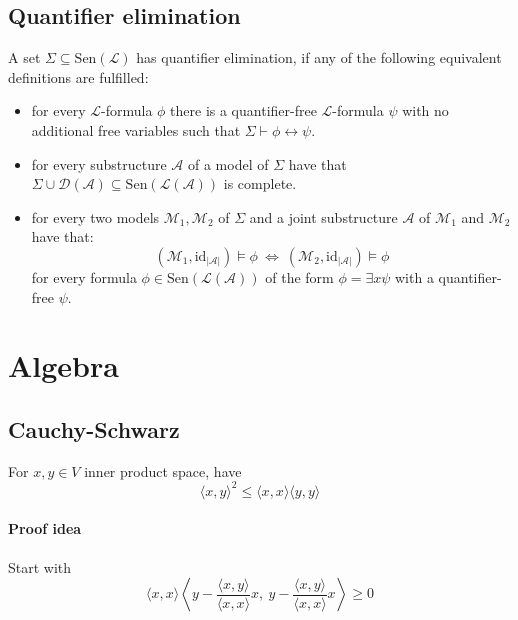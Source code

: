 \documentclass{scrartcl}
\begin{document}
\subsection{Quantifier elimination}
A set $\Sigma \subseteq \mathrm{Sen}(\mathcal{L})$ has quantifier elimination, if any of the following equivalent definitions are fulfilled:
\begin{itemize}
    \item for every $\mathcal{L}$-formula $\phi$ there is a quantifier-free $\mathcal{L}$-formula $\psi$ with no additional free variables such that $\Sigma \vdash \phi \leftrightarrow \psi$.
    \item for every substructure $\mathcal{A}$ of a model of $\Sigma$ have that $\Sigma \cup \mathcal{D}(\mathcal{A}) \subseteq \mathrm{Sen}(\mathcal{L}(\mathcal{A}))$ is complete.
    \item for every two models $\mathcal{M}_1, \mathcal{M}_2$ of $\Sigma$ and a joint substructure $\mathcal{A}$ of $\mathcal{M}_1$ and $\mathcal{M}_2$ have that:
    \begin{equation*}
        (\mathcal{M}_1, \mathrm{id}_{|\mathcal{A}|}) \models \phi \ \Leftrightarrow \ (\mathcal{M}_2, \mathrm{id}_{|\mathcal{A}|}) \models \phi
    \end{equation*}
    for every formula $\phi \in \mathrm{Sen}(\mathcal{L}(\mathcal{A}))$ of the form $\phi = \exists x \psi$ with a quantifier-free $\psi$.
\end{itemize}

\section{Algebra}

\subsection{Cauchy-Schwarz}

For $x, y \in V$ inner product space, have
\begin{equation}
    \langle x, y \rangle^2 \leq \langle x, x \rangle \langle y, y \rangle \nonumber
\end{equation}
\paragraph{Proof idea} Start with
\begin{equation}
    \langle x, x \rangle \left\langle y - \frac {\langle x, y \rangle}{\langle x, x \rangle} x, \ y - \frac {\langle x, y \rangle}{\langle x, x \rangle} x \right\rangle \geq 0 \nonumber
\end{equation}
\end{document}
